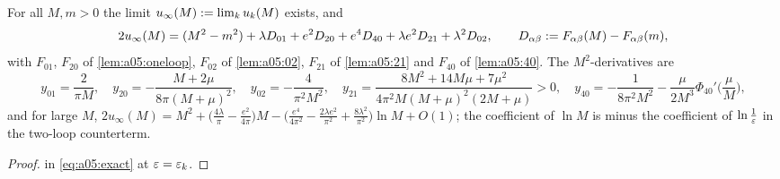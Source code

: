 \begin{theorem}\label{thm:a05:E}
For all $M,m>0$ the limit $u_\infty(M):=\lim_ku_k(M)$ exists, and
\[
2u_\infty(M)=(M^2-m^2)+\lambda D_{01}+e^2D_{20}+e^4D_{40}+\lambda e^2D_{21}+\lambda^2D_{02},\qquad D_{\alpha\beta}:= F_{\alpha\beta}(M)-F_{\alpha\beta}(m),
\]
with $F_{01}$, $F_{20}$ of \cref{lem:a05:oneloop}, $F_{02}$ of \cref{lem:a05:02}, $F_{21}$ of \cref{lem:a05:21} and $F_{40}$ of \cref{lem:a05:40}. The $M^2$-derivatives are
\[
y_{01}=\frac2{\pi M},\quad y_{20}=-\frac{M+2\mu}{8\pi(M+\mu)^2},\quad y_{02}=-\frac4{\pi^2M^2},\quad y_{21}=\frac{8M^2+14M\mu+7\mu^2}{4\pi^2M(M+\mu)^2(2M+\mu)}>0,\quad y_{40}=-\frac1{8\pi^2M^2}-\frac\mu{2M^3}\Phi_{40}'\Big(\frac\mu M\Big),
\]
and for large $M$, $2u_\infty(M)=M^2+\big(\frac{4\lambda}\pi-\frac{e^2}{4\pi}\big)M-\big(\frac{e^4}{4\pi^2}-\frac{2\lambda e^2}{\pi^2}+\frac{8\lambda^2}{\pi^2}\big)\ln M+O(1)$; the coefficient of $\ln M$ is minus the coefficient of $\ln\frac1{\varepsilon}$ in the two-loop counterterm.
\end{theorem}
\begin{proof}
 in \eqref{eq:a05:exact} at $\varepsilon=\varepsilon_k$.
\end{proof}

